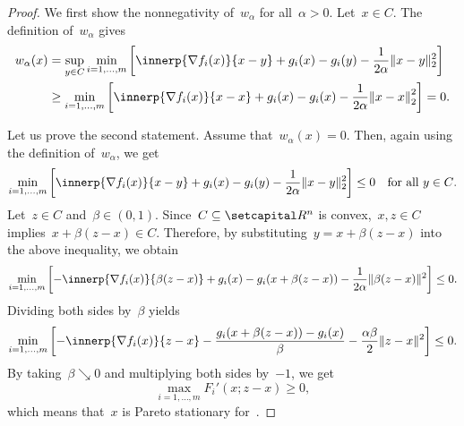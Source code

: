 \documentclass[../../main]{subfiles}
\begin{document}
\begin{proof}
    We first show the nonnegativity of~$w_\alpha$ for all~$\alpha > 0$.
    Let~$x \in C$.
    The definition of~$w_\alpha$ gives
    \begin{align}
        w_\alpha(x)
        &= \sup_{y \in C} \min_{i = 1, \dots, m} \left[ \innerp{\nabla f_i(x)}{x - y} + g_i(x) - g_i(y) - \frac{1}{2 \alpha} \norm{x - y}_2^2 \right] \\
        &\ge \min_{i = 1, \dots, m} \left[ \innerp{\nabla f_i(x)}{x - x} + g_i(x) - g_i(x) - \frac{1}{2 \alpha} \norm*{x - x}_2^2 \right] = 0
    .\end{align}

    Let us prove the second statement.
    Assume that~$w_\alpha(x) = 0$.
    Then, again using the definition of~$w_\alpha$, we get
    \begin{equation}
        \min_{i = 1, \dots, m} \left[ \innerp{\nabla f_i(x)}{x - y} + g_i(x) - g_i(y) - \frac{1}{2 \alpha} \norm{x - y}_2^2 \right] \le 0 \forallcondition{y \in C}
    .\end{equation} 
    Let~$z \in C$ and~$\beta \in (0, 1)$.
    Since~$C \subseteq \setR^n$ is convex,~$x, z \in C$ implies~$x + \beta (z - x) \in C$.
    Therefore, by substituting~$y = x + \beta (z - x)$ into the above inequality, we obtain
    \begin{equation}
        \min_{i = 1, \dots, m} \left[ - \innerp{\nabla f_i(x)}{\beta (z - x)} + g_i(x) - g_i(x + \beta (z - x)) - \frac{1}{2 \alpha} \norm{\beta (z - x)}^2 \right] \le 0
    .\end{equation} 
    Dividing both sides by~$\beta$ yields
    \begin{equation}
        \min_{i = 1, \dots, m} \left[ - \innerp{\nabla f_i(x)}{z - x} - \frac{g_i(x + \beta (z - x)) - g_i(x)}{\beta} - \frac{\alpha \beta}{2} \norm{z - x}^2 \right] \le 0
    .\end{equation} 
    By taking~$\beta \searrow 0$ and multiplying both sides by~$- 1$, we get
    \begin{equation}
        \max_{i = 1, \dots, m} F_i'(x; z - x) \ge 0
    ,\end{equation} 
    which means that~$x$ is Pareto stationary for~.


\end{proof}
\end{document}
